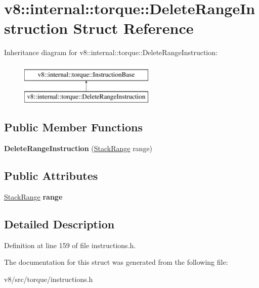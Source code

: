 \hypertarget{structv8_1_1internal_1_1torque_1_1DeleteRangeInstruction}{}\section{v8\+:\+:internal\+:\+:torque\+:\+:Delete\+Range\+Instruction Struct Reference}
\label{structv8_1_1internal_1_1torque_1_1DeleteRangeInstruction}
Inheritance diagram for v8\+:\+:internal\+:\+:torque\+:\+:Delete\+Range\+Instruction\+:\begin{figure}[H]
\begin{center}
\leavevmode
\includegraphics[height=2.000000cm]{structv8_1_1internal_1_1torque_1_1DeleteRangeInstruction}
\end{center}
\end{figure}
\subsection*{Public Member Functions}
\begin{DoxyCompactItemize}
\item 
\mbox{\label{structv8_1_1internal_1_1torque_1_1DeleteRangeInstruction_ac0a1a4b7dd20c5e0a67e4b241c3e7014}} 
{\bfseries Delete\+Range\+Instruction} (\mbox{\hyperlink{classv8_1_1internal_1_1torque_1_1StackRange}{Stack\+Range}} range)
\end{DoxyCompactItemize}
\subsection*{Public Attributes}
\begin{DoxyCompactItemize}
\item 
\mbox{\label{structv8_1_1internal_1_1torque_1_1DeleteRangeInstruction_a5a00195993da053810a129eab7d3e712}} 
\mbox{\hyperlink{classv8_1_1internal_1_1torque_1_1StackRange}{Stack\+Range}} {\bfseries range}
\end{DoxyCompactItemize}


\subsection{Detailed Description}


Definition at line 159 of file instructions.\+h.



The documentation for this struct was generated from the following file\+:\begin{DoxyCompactItemize}
\item 
v8/src/torque/instructions.\+h\end{DoxyCompactItemize}
